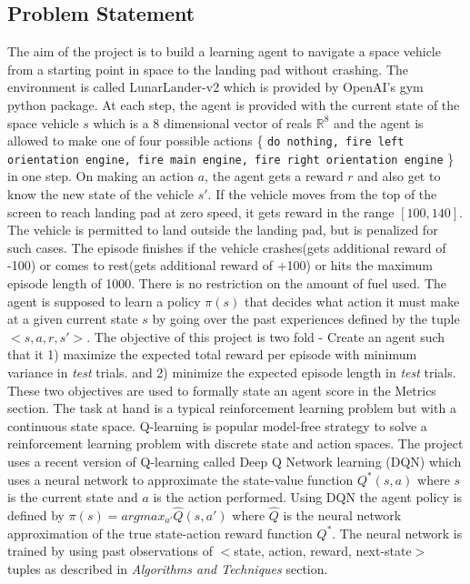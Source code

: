 \documentclass{article}
\begin{document}
\subsection*{Problem Statement}
The aim of the project is to build a learning agent to navigate a space vehicle from a starting point in space to the landing pad without crashing. The environment is called LunarLander-v2 which is provided by OpenAI's gym python package. At each step, the agent is provided with the current state of the space vehicle $s$ which is a 8 dimensional vector of reals $\mathbb{R}^8$ and the agent is allowed to make one of four possible actions \{ \texttt{do nothing, fire left orientation engine, fire main engine, fire right orientation engine} \} in one step. On making an action $a$, the agent gets a reward $r$ and also get to know the new state of the vehicle $s'$. If the vehicle moves from the top of the screen to reach landing pad at zero speed, it gets reward in the range $[100, 140]$. The vehicle is permitted to land outside the landing pad, but is penalized for such cases. The episode finishes if the vehicle crashes(gets additional reward of -100) or comes to rest(gets additional reward of +100) or hits the maximum episode length of 1000. There is no restriction on the amount of fuel used. The agent is supposed to learn a policy $\pi(s)$ that decides what action it must make at a given current state $s$ by going over the past experiences defined by the tuple $<s, a, r, s'>$.  The objective of this project is two fold - Create an agent such that it 1) maximize the expected total reward per episode with minimum variance in \textit{test} trials. and 2) minimize the expected episode length in \textit{test} trials. These two objectives are used to formally state an agent score in the Metrics section. The task at hand is a typical reinforcement learning problem but with a continuous state space. Q-learning is popular model-free strategy to solve a reinforcement learning problem with discrete state and action spaces. The project uses a recent version of Q-learning called Deep Q Network learning (DQN)\cite{DQN} which uses a neural network to approximate the state-value function $Q^*(s,a)$ where $s$ is the current state and $a$ is the action performed. Using DQN the agent policy is defined by $\pi(s) = argmax_{a'} \hat{Q}(s,a')$ where $\hat{Q}$ is the neural network approximation of the true state-action reward function $Q^*$. The neural network is trained by using past observations of $<$state, action, reward, next-state$>$ tuples as described in \textit{Algorithms and Techniques} section.
\end{document}

